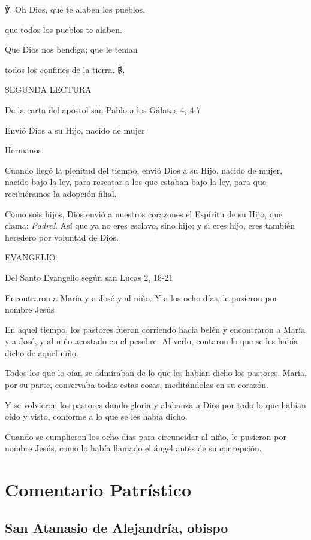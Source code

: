 \begin{body}
\begin{body}
℣. Oh Dios, que te alaben los pueblos,

que todos los pueblos te alaben.

Que Dios nos bendiga; que le teman

todos los confines de la tierra. ℟.

SEGUNDA LECTURA

De la carta del apóstol san Pablo a los Gálatas 4, 4-7

Envió Dios a su Hijo, nacido de mujer

Hermanos:

Cuando llegó la plenitud del tiempo, envió Dios a su Hijo, nacido de
mujer, nacido bajo la ley, para rescatar a los que estaban bajo la ley,
para que recibiéramos la adopción filial.

Como sois hijos, Dios envió a nuestros corazones el Espíritu de su Hijo,
que clama: \emph{ Padre!}. Así que ya no eres esclavo, sino
hijo; y si eres hijo, eres también heredero por voluntad de Dios.

EVANGELIO

Del Santo Evangelio según san Lucas 2, 16-21

Encontraron a María y a José y al niño. Y a los ocho días, le pusieron
por nombre Jesús

En aquel tiempo, los pastores fueron corriendo hacia belén y encontraron
a María y a José, y al niño acostado en el pesebre. Al verlo, contaron
lo que se les había dicho de aquel niño.

Todos los que lo oían se admiraban de lo que les habían dicho los
pastores. María, por su parte, conservaba todas estas cosas,
meditándolas en su corazón.

Y se volvieron los pastores dando gloria y alabanza a Dios por todo lo
que habían oído y visto, conforme a lo que se les había dicho.

Cuando se cumplieron los ocho días para circuncidar al niño, le pusieron
por nombre Jesús, como lo había llamado el ángel antes de su concepción.


\section{Comentario Patrístico}

\subsection{San Atanasio de Alejandría, obispo}


\end{body}
\end{body}
